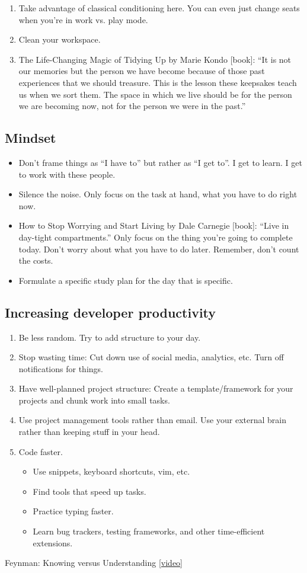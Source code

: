\begin{enumerate}
	\item Take advantage of classical conditioning here. You can even just change seats when you're in work vs. play mode. 
	\item Clean your workspace. 
	\item The Life-Changing Magic of Tidying Up by Marie Kondo [book]: ``It is not our memories but the person we have become because of those past experiences that we should treasure. This is the lesson these keepsakes teach us when we sort them. The space in which we live should be for the person we are becoming now, not for the person we were in the past.''
\end{enumerate}

\subsection{Mindset}

\begin{itemize}
	\item Don't frame things as ``I have to'' but rather as ``I get to''. I get to learn. I get to work with these people. 
	\item Silence the noise. Only focus on the task at hand, what you have to do right now. 
	\item How to Stop Worrying and Start Living by Dale Carnegie [book]: ``Live in day-tight compartments.'' Only focus on the thing you're going to complete today. Don't worry about what you have to do later. Remember, don't count the costs. 
	\item Formulate a specific study plan for the day that is specific. 
\end{itemize}


\subsection*{Increasing developer productivity}
\begin{enumerate}
	\item Be less random. Try to add structure to your day. 
	\item Stop wasting time: Cut down use of social media, analytics, etc. Turn off notifications for things. 
	\item Have well-planned project structure: Create a template/framework for your projects and chunk work into small tasks. 
	\item Use project management tools rather than email. Use your external brain rather than keeping stuff in your head. 
	\item Code faster. 
	\begin{itemize}
		\item Use snippets, keyboard shortcuts, vim, etc. 
		\item Find tools that speed up tasks. 
		\item Practice typing faster.
		\item Learn bug trackers, testing frameworks, and other time-efficient extensions. 
	\end{itemize}
\end{enumerate}




Feynman: Knowing versus Understanding \href{https://youtu.be/NM-zWTU7X-k}{[video]}



